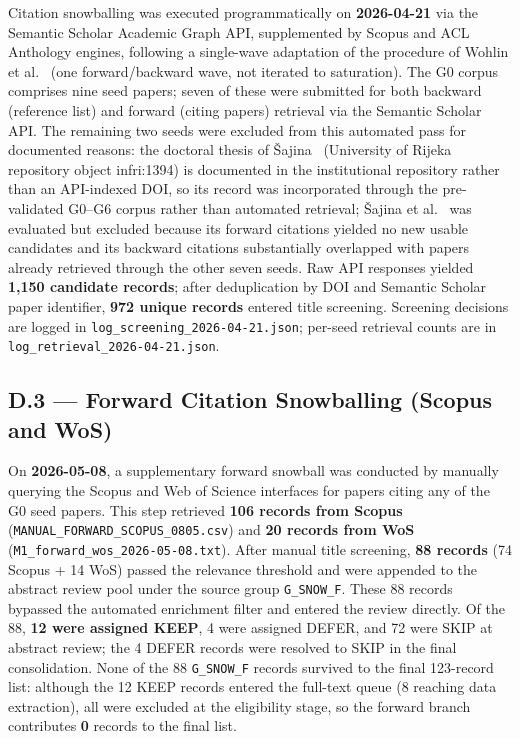 Citation snowballing was executed programmatically on \textbf{2026-04-21} via the
Semantic Scholar Academic Graph API, supplemented by Scopus and ACL Anthology engines,
following a single-wave adaptation of the procedure of Wohlin et
al.~\cite{Wohlin2014} (one forward/backward wave, not iterated to saturation).
The G0 corpus comprises nine seed
papers; seven of these were submitted for both backward (reference list) and forward (citing
papers) retrieval via the Semantic Scholar API. The remaining two seeds were
excluded from this automated pass for documented reasons: the doctoral thesis
of \v{S}ajina~\cite{Sajina2025} (University of Rijeka repository object
infri:1394) is documented in the institutional repository rather than an
API-indexed DOI, so its record was incorporated through the pre-validated
G0--G6 corpus rather than automated retrieval; \v{S}ajina et
al.~\cite{Sajina2024} was evaluated but excluded because its forward citations
yielded no new usable candidates and its backward citations substantially
overlapped with papers already retrieved through the other seven seeds. Raw API
responses yielded \textbf{1,150 candidate records}; after deduplication by DOI and
Semantic Scholar paper identifier, \textbf{972 unique records} entered title screening.
Screening decisions are logged in \texttt{log\_screening\_2026-04-21.json}; per-seed
retrieval counts are in \texttt{log\_retrieval\_2026-04-21.json}.

\subsection*{D.3 — Forward Citation Snowballing (Scopus and WoS)}
\label{app:search_log:forward}

On \textbf{2026-05-08}, a supplementary forward snowball was conducted by manually
querying the Scopus and Web of Science interfaces for papers citing any of the G0 seed
papers. This step retrieved \textbf{106 records from Scopus}
(\texttt{MANUAL\_FORWARD\_SCOPUS\_0805.csv}) and \textbf{20 records from WoS}
(\texttt{M1\_forward\_wos\_2026-05-08.txt}). After manual title screening, \textbf{88
records} (74 Scopus + 14 WoS) passed the relevance threshold and were appended to the
abstract review pool under the source group \texttt{G\_SNOW\_F}. These 88 records
bypassed the automated enrichment filter and entered the review directly. Of the 88,
\textbf{12 were assigned KEEP}, 4 were assigned DEFER, and 72 were SKIP at abstract
review; the 4 DEFER records were resolved to SKIP in the final consolidation.
None of the 88 \texttt{G\_SNOW\_F} records survived to the final 123-record list:
although the 12 KEEP records entered the full-text queue (8 reaching data
extraction), all were excluded at the eligibility stage, so the forward branch
contributes \textbf{0} records to the final list.

